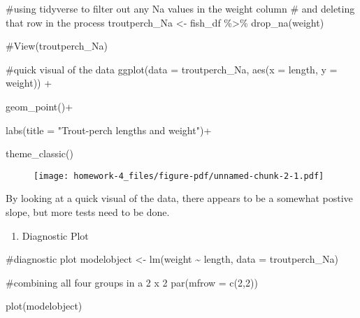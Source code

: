 \documentclass[
  letterpaper,
  DIV=11,
  numbers=noendperiod]{scrartcl}
\newenvironment{Shaded}{\begin{snugshade}}{\end{snugshade}}
\newcommand{\AttributeTok}[1]{\textcolor[rgb]{0.40,0.45,0.13}{#1}}
\newcommand{\CommentTok}[1]{\textcolor[rgb]{0.37,0.37,0.37}{#1}}
\newcommand{\DecValTok}[1]{\textcolor[rgb]{0.68,0.00,0.00}{#1}}
\newcommand{\FunctionTok}[1]{\textcolor[rgb]{0.28,0.35,0.67}{#1}}
\newcommand{\NormalTok}[1]{\textcolor[rgb]{0.00,0.23,0.31}{#1}}
\newcommand{\OtherTok}[1]{\textcolor[rgb]{0.00,0.23,0.31}{#1}}
\newcommand{\SpecialCharTok}[1]{\textcolor[rgb]{0.37,0.37,0.37}{#1}}
\newcommand{\StringTok}[1]{\textcolor[rgb]{0.13,0.47,0.30}{#1}}
\providecommand{\tightlist}{%
  \setlength{\itemsep}{0pt}\setlength{\parskip}{0pt}}\usepackage{longtable,booktabs,array}
\begin{document}
\begin{Shaded}
\begin{Highlighting}[]
\CommentTok{\#using tidyverse to filter out any Na values in the weight column \# and deleting that row in the process}
\NormalTok{troutperch\_Na }\OtherTok{\textless{}{-}}\NormalTok{ fish\_df }\SpecialCharTok{\%\textgreater{}\%} 
  \FunctionTok{drop\_na}\NormalTok{(weight)}

\CommentTok{\#View(troutperch\_Na)}
\end{Highlighting}
\end{Shaded}

\begin{Shaded}
\begin{Highlighting}[]
\CommentTok{\#quick visual of the data }
\FunctionTok{ggplot}\NormalTok{(}\AttributeTok{data =}\NormalTok{ troutperch\_Na, }\FunctionTok{aes}\NormalTok{(}\AttributeTok{x =}\NormalTok{ length, }\AttributeTok{y =}\NormalTok{ weight)) }\SpecialCharTok{+} 
  
  \FunctionTok{geom\_point}\NormalTok{()}\SpecialCharTok{+}
  
  \FunctionTok{labs}\NormalTok{(}\AttributeTok{title =} \StringTok{"Trout{-}perch lengths and weight"}\NormalTok{)}\SpecialCharTok{+}
  
  \FunctionTok{theme\_classic}\NormalTok{()}
\end{Highlighting}
\end{Shaded}

\begin{figure}[H]

{\centering \texttt{[image: homework-4\_files/figure-pdf/unnamed-chunk-2-1.pdf]}

}

\end{figure}

By looking at a quick visual of the data, there appears to be a somewhat
postive slope, but more tests need to be done.

\begin{enumerate}
\def\labelenumi{\arabic{enumi}.}
\setcounter{enumi}{4}
\tightlist
\item
  Diagnostic Plot
\end{enumerate}

\begin{Shaded}
\begin{Highlighting}[]
\CommentTok{\#diagnostic plot}
\NormalTok{modelobject }\OtherTok{\textless{}{-}} \FunctionTok{lm}\NormalTok{(weight }\SpecialCharTok{\textasciitilde{}}\NormalTok{ length, }\AttributeTok{data =}\NormalTok{ troutperch\_Na)}

\CommentTok{\#combining all four groups in a 2 x 2}
\FunctionTok{par}\NormalTok{(}\AttributeTok{mfrow =} \FunctionTok{c}\NormalTok{(}\DecValTok{2}\NormalTok{,}\DecValTok{2}\NormalTok{))}

\FunctionTok{plot}\NormalTok{(modelobject)}
\end{Highlighting}
\end{Shaded}
\end{document}
